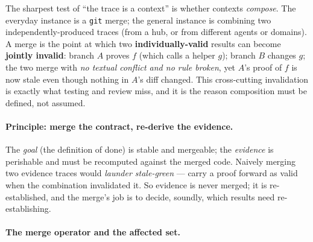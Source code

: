 \documentclass[11pt]{article}
\newcommand{\codeus}{\textunderscore\penalty100\relax}
\newcommand{\code}[1]{\texttt{\let\_\codeus #1}}
\begin{document}
The sharpest test of ``the trace is a context'' is whether contexts \emph{compose}. The everyday instance
is a \code{git} merge; the general instance is combining two independently-produced traces (from a hub, or
from different agents or domains). A merge is the point at which two \textbf{individually-valid} results can
become \textbf{jointly invalid}: branch $A$ proves $f$ (which calls a helper $g$); branch $B$ changes $g$;
the two merge with \emph{no textual conflict and no rule broken}, yet $A$'s proof of $f$ is now stale even
though nothing in $A$'s diff changed. This cross-cutting invalidation is exactly what testing and review
miss, and it is the reason composition must be defined, not assumed.

\paragraph{Principle: merge the contract, re-derive the evidence.} The \emph{goal} (the definition of done)
is stable and mergeable; the \emph{evidence} is perishable and must be recomputed against the merged code.
Naively merging two evidence traces would \emph{launder stale-green} --- carry a proof forward as valid when
the combination invalidated it. So evidence is never merged; it is re-established, and the merge's job is to
decide, soundly, which results need re-establishing.

\paragraph{The merge operator and the affected set.}
\end{document}
